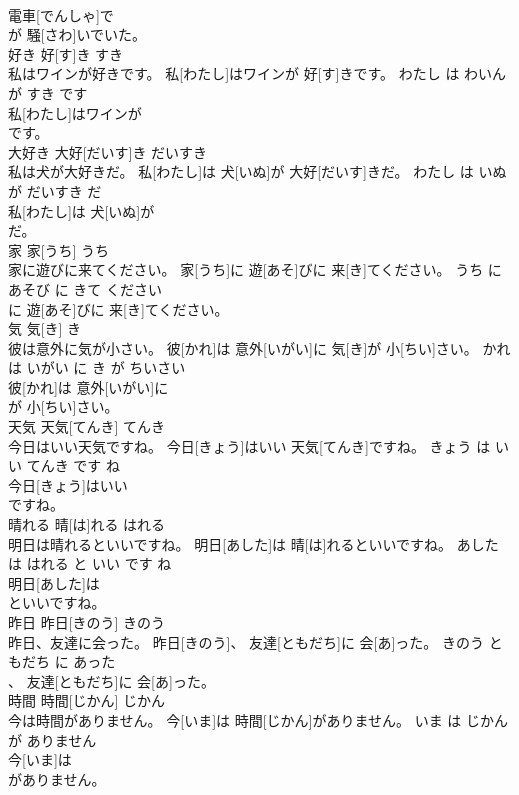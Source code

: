 \documentclass[8pt]{extreport}
\begin{document}
\begin{CJK}{UTF8}{min}
\\	電車[でんしゃ]で
\\	が 騒[さわ]いでいた。			
\\	好き	好[す]き	すき	
\\	私はワインが好きです。	私[わたし]はワインが 好[す]きです。	わたし は わいん が すき です	
\\	私[わたし]はワインが
\\	です。			
\\	大好き	大好[だいす]き	だいすき	
\\	私は犬が大好きだ。	私[わたし]は 犬[いぬ]が 大好[だいす]きだ。	わたし は いぬ が だいすき だ	
\\	私[わたし]は 犬[いぬ]が
\\	だ。			
\\	家	家[うち]	うち	
\\	家に遊びに来てください。	家[うち]に 遊[あそ]びに 来[き]てください。	うち に あそび に きて ください	
\\	に 遊[あそ]びに 来[き]てください。			
\\	気	気[き]	き	
\\	彼は意外に気が小さい。	彼[かれ]は 意外[いがい]に 気[き]が 小[ちい]さい。	かれ は いがい に き が ちいさい	
\\	彼[かれ]は 意外[いがい]に
\\	が 小[ちい]さい。			
\\	天気	天気[てんき]	てんき	
\\	今日はいい天気ですね。	今日[きょう]はいい 天気[てんき]ですね。	きょう は いい てんき です ね	
\\	今日[きょう]はいい
\\	ですね。			
\\	晴れる	晴[は]れる	はれる	
\\	明日は晴れるといいですね。	明日[あした]は 晴[は]れるといいですね。	あした は はれる と いい です ね	
\\	明日[あした]は
\\	といいですね。			
\\	昨日	昨日[きのう]	きのう	
\\	昨日、友達に会った。	昨日[きのう]、 友達[ともだち]に 会[あ]った。	きのう ともだち に あった	
\\	、 友達[ともだち]に 会[あ]った。			
\\	時間	時間[じかん]	じかん	
\\	今は時間がありません。	今[いま]は 時間[じかん]がありません。	いま は じかん が ありません	
\\	今[いま]は
\\	がありません。			

\end{CJK}
\end{document}
